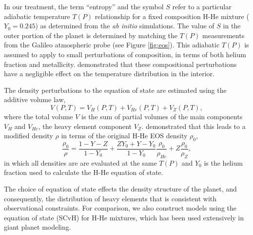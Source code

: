 In our treatment, the term ``entropy'' and the symbol $S$ refer to a particular
adiabatic temperature $T(P)$ relationship for a fixed composition H-He mixture
($Y_0=0.245$) as determined from the \textit{ab initio} simulations. The value of $S$
in the outer portion of the planet is determined by matching the $T(P)$ measurements
from the Galileo atmospheric probe (see Figure \ref{fig:eos}). This adiabatic $T(P)$
is assumed to apply to small perturbations of composition, in terms of both helium
fraction and metallicity. \citet{hubbard2016} demonstrated that these compositional
perturbations have a negligible effect on the temperature distribution in the
interior.

The density perturbations to the equation of state are estimated using the additive
volume law,
%
\begin{equation} 
    V(P, T) = V_H(P, T) + V_{He}(P, T) + V_{Z}(P,T),
 \label{eq:volume_law}
\end{equation}
%
where the total volume $V$ is the sum of partial volumes of the main components $V_H$
and $V_{He}$, the heavy element component $V_Z$. \citet{hubbard2016} demonstrated
that this leads to a modified density $\rho$ in terms of the original H-He EOS
density $\rho_0$,
%
\begin{equation} 
    \frac{\rho_0}{\rho} = \frac{1-Y-Z}{1-Y_0} + 
    \frac{ZY_0 + Y - Y_0}{1-Y_0}\frac{\rho_0}{\rho_{He}} + Z\frac{\rho_0}{\rho_Z},
 \label{eq:density_ratio}
\end{equation}
%
in which all densities are are evaluated at the same $T(P)$ and $Y_0$ is the helium
fraction used to calculate the H-He equation of state.

The choice of equation of state effects the density structure of the planet, and
consequently, the distribution of heavy elements that is consistent with observational
constraints. For comparison, we also construct models using the \citet{saumon1995}
equation of state (SCvH) for H-He mixtures, which has been used extensively in giant planet
modeling. 

